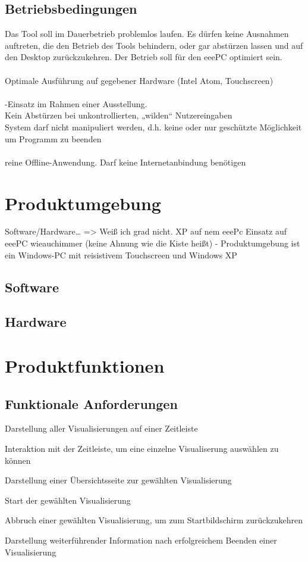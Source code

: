 \documentclass{article}
\begin{document}
\subsection{Betriebsbedingungen}

Das Tool soll im Dauerbetrieb problemlos laufen. 
Es dürfen keine Ausnahmen auftreten, die den Betrieb des Tools behindern, 
oder gar abstürzen lassen und auf den Desktop zurückzukehren. 
Der Betrieb soll für den eeePC optimiert sein.
\\
\\
Optimale Ausführung auf gegebener Hardware (Intel Atom, Touchscreen)
\\
\\
-Einsatz im Rahmen einer Ausstellung.
\\
Kein Abstürzen bei unkontrollierten, „wilden“ Nutzereingaben
\\
System darf nicht manipuliert werden, d.h. keine oder nur geschützte
Möglichkeit um Programm zu beenden
\\
\\
reine Offline-Anwendung. Darf keine Internetanbindung benötigen
\section{Produktumgebung}

Software/Hardware… => Weiß ich grad nicht. XP auf nem eeePc
Einsatz auf eeePC wieauchimmer (keine Ahnung wie die Kiste heißt)
- Produktumgebung ist ein Windows-PC mit reisistivem Touchscreen 
und Windows XP

\subsection{Software}

\subsection{Hardware}

\section{Produktfunktionen}

\subsection{Funktionale Anforderungen}

\begin{FA}[start=100]
\item Darstellung aller Visualisierungen auf einer Zeitleiste
\item Interaktion mit der Zeitleiste, um eine einzelne Visualiserung auswählen zu können
\item Darstellung einer Übersichtsseite zur gewählten Visualisierung
\item Start der gewählten Visualisierung
\item Abbruch einer gewählten Visualisierung, um zum Startbildschirm zurückzukehren
\item Darstellung weiterführender Information nach erfolgreichem Beenden einer Visualisierung
\end{FA}
\end{document}
